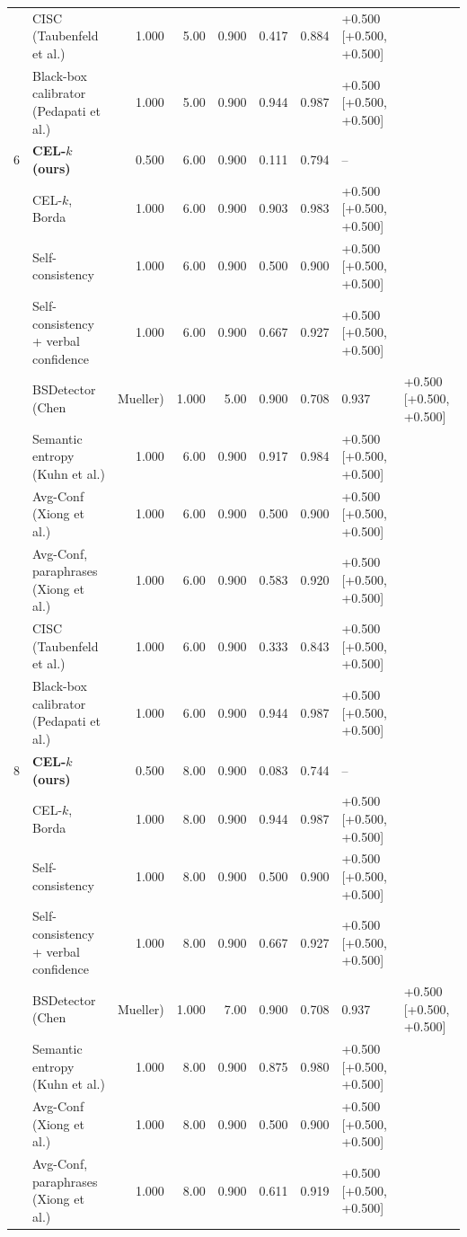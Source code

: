 \begin{table}[t]
\begin{tabular}{llrrrrrl}
 & CISC (Taubenfeld et al.) & 1.000 & 5.00 & 0.900 & 0.417 & 0.884 & +0.500 [+0.500, +0.500] \\
 & Black-box calibrator (Pedapati et al.) & 1.000 & 5.00 & 0.900 & 0.944 & 0.987 & +0.500 [+0.500, +0.500] \\
6 & \textbf{CEL-$k$ (ours)} & 0.500 & 6.00 & 0.900 & 0.111 & 0.794 & -- \\
 & \quad CEL-$k$, Borda & 1.000 & 6.00 & 0.900 & 0.903 & 0.983 & +0.500 [+0.500, +0.500] \\
 & Self-consistency & 1.000 & 6.00 & 0.900 & 0.500 & 0.900 & +0.500 [+0.500, +0.500] \\
 & Self-consistency + verbal confidence & 1.000 & 6.00 & 0.900 & 0.667 & 0.927 & +0.500 [+0.500, +0.500] \\
 & BSDetector (Chen & Mueller) & 1.000 & 5.00 & 0.900 & 0.708 & 0.937 & +0.500 [+0.500, +0.500] \\
 & Semantic entropy (Kuhn et al.) & 1.000 & 6.00 & 0.900 & 0.917 & 0.984 & +0.500 [+0.500, +0.500] \\
 & Avg-Conf (Xiong et al.) & 1.000 & 6.00 & 0.900 & 0.500 & 0.900 & +0.500 [+0.500, +0.500] \\
 & Avg-Conf, paraphrases (Xiong et al.) & 1.000 & 6.00 & 0.900 & 0.583 & 0.920 & +0.500 [+0.500, +0.500] \\
 & CISC (Taubenfeld et al.) & 1.000 & 6.00 & 0.900 & 0.333 & 0.843 & +0.500 [+0.500, +0.500] \\
 & Black-box calibrator (Pedapati et al.) & 1.000 & 6.00 & 0.900 & 0.944 & 0.987 & +0.500 [+0.500, +0.500] \\
8 & \textbf{CEL-$k$ (ours)} & 0.500 & 8.00 & 0.900 & 0.083 & 0.744 & -- \\
 & \quad CEL-$k$, Borda & 1.000 & 8.00 & 0.900 & 0.944 & 0.987 & +0.500 [+0.500, +0.500] \\
 & Self-consistency & 1.000 & 8.00 & 0.900 & 0.500 & 0.900 & +0.500 [+0.500, +0.500] \\
 & Self-consistency + verbal confidence & 1.000 & 8.00 & 0.900 & 0.667 & 0.927 & +0.500 [+0.500, +0.500] \\
 & BSDetector (Chen & Mueller) & 1.000 & 7.00 & 0.900 & 0.708 & 0.937 & +0.500 [+0.500, +0.500] \\
 & Semantic entropy (Kuhn et al.) & 1.000 & 8.00 & 0.900 & 0.875 & 0.980 & +0.500 [+0.500, +0.500] \\
 & Avg-Conf (Xiong et al.) & 1.000 & 8.00 & 0.900 & 0.500 & 0.900 & +0.500 [+0.500, +0.500] \\
 & Avg-Conf, paraphrases (Xiong et al.) & 1.000 & 8.00 & 0.900 & 0.611 & 0.919 & +0.500 [+0.500, +0.500] \\

\end{tabular}
\end{table}
